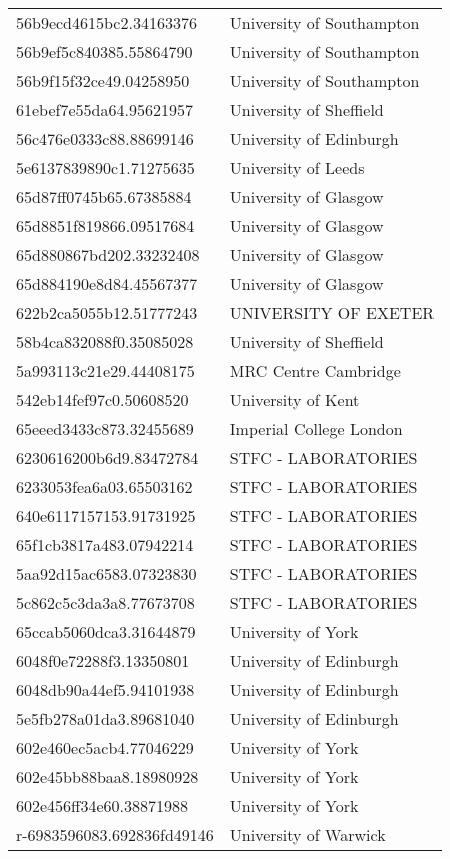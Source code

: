 \begin{tabular}{ll}
56b9ecd4615bc2.34163376 & University of Southampton \\
56b9ef5c840385.55864790 & University of Southampton \\
56b9f15f32ce49.04258950 & University of Southampton \\
61ebef7e55da64.95621957 & University of Sheffield \\
56c476e0333c88.88699146 & University of Edinburgh \\
5e6137839890c1.71275635 & University of Leeds \\
65d87ff0745b65.67385884 & University of Glasgow \\
65d8851f819866.09517684 & University of Glasgow \\
65d880867bd202.33232408 & University of Glasgow \\
65d884190e8d84.45567377 & University of Glasgow \\
622b2ca5055b12.51777243 & UNIVERSITY OF EXETER \\
58b4ca832088f0.35085028 & University of Sheffield \\
5a993113c21e29.44408175 & MRC Centre Cambridge \\
542eb14fef97c0.50608520 & University of Kent \\
65eeed3433c873.32455689 & Imperial College London \\
6230616200b6d9.83472784 & STFC - LABORATORIES \\
6233053fea6a03.65503162 & STFC - LABORATORIES \\
640e6117157153.91731925 & STFC - LABORATORIES \\
65f1cb3817a483.07942214 & STFC - LABORATORIES \\
5aa92d15ac6583.07323830 & STFC - LABORATORIES \\
5c862c5c3da3a8.77673708 & STFC - LABORATORIES \\
65ccab5060dca3.31644879 & University of York \\
6048f0e72288f3.13350801 & University of Edinburgh \\
6048db90a44ef5.94101938 & University of Edinburgh \\
5e5fb278a01da3.89681040 & University of Edinburgh \\
602e460ec5acb4.77046229 & University of York \\
602e45bb88baa8.18980928 & University of York \\
602e456ff34e60.38871988 & University of York \\
r-6983596083.692836fd49146 & University of Warwick \\

\end{tabular}
